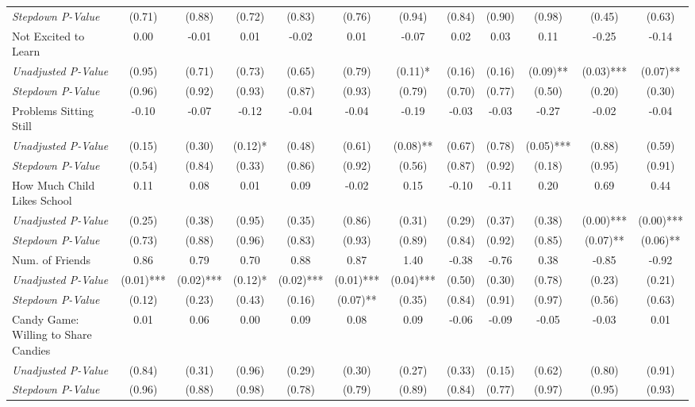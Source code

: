 \begin{tabular}{l c c c c c c c c c c c}
\quad \textit{Stepdown P-Value} & (0.71) & (0.88) & (0.72) & (0.83) & (0.76) & (0.94) & (0.84) & (0.90) & (0.98) & (0.45) & (0.63) \\
Not Excited to Learn & 0.00 & -0.01 & 0.01 & -0.02 & 0.01 & -0.07 & 0.02 & 0.03 & 0.11 & -0.25 & -0.14 \\
\quad \textit{Unadjusted P-Value} & (0.95) & (0.71) & (0.73) & (0.65) & (0.79) & (0.11)* & (0.16) & (0.16) & (0.09)** & (0.03)*** & (0.07)** \\
\quad \textit{Stepdown P-Value} & (0.96) & (0.92) & (0.93) & (0.87) & (0.93) & (0.79) & (0.70) & (0.77) & (0.50) & (0.20) & (0.30) \\
Problems Sitting Still & -0.10 & -0.07 & -0.12 & -0.04 & -0.04 & -0.19 & -0.03 & -0.03 & -0.27 & -0.02 & -0.04 \\
\quad \textit{Unadjusted P-Value} & (0.15) & (0.30) & (0.12)* & (0.48) & (0.61) & (0.08)** & (0.67) & (0.78) & (0.05)*** & (0.88) & (0.59) \\
\quad \textit{Stepdown P-Value} & (0.54) & (0.84) & (0.33) & (0.86) & (0.92) & (0.56) & (0.87) & (0.92) & (0.18) & (0.95) & (0.91) \\
How Much Child Likes School & 0.11 & 0.08 & 0.01 & 0.09 & -0.02 & 0.15 & -0.10 & -0.11 & 0.20 & 0.69 & 0.44 \\
\quad \textit{Unadjusted P-Value} & (0.25) & (0.38) & (0.95) & (0.35) & (0.86) & (0.31) & (0.29) & (0.37) & (0.38) & (0.00)*** & (0.00)*** \\
\quad \textit{Stepdown P-Value} & (0.73) & (0.88) & (0.96) & (0.83) & (0.93) & (0.89) & (0.84) & (0.92) & (0.85) & (0.07)** & (0.06)** \\
Num. of Friends & 0.86 & 0.79 & 0.70 & 0.88 & 0.87 & 1.40 & -0.38 & -0.76 & 0.38 & -0.85 & -0.92 \\
\quad \textit{Unadjusted P-Value} & (0.01)*** & (0.02)*** & (0.12)* & (0.02)*** & (0.01)*** & (0.04)*** & (0.50) & (0.30) & (0.78) & (0.23) & (0.21) \\
\quad \textit{Stepdown P-Value} & (0.12) & (0.23) & (0.43) & (0.16) & (0.07)** & (0.35) & (0.84) & (0.91) & (0.97) & (0.56) & (0.63) \\
Candy Game: Willing to Share Candies & 0.01 & 0.06 & 0.00 & 0.09 & 0.08 & 0.09 & -0.06 & -0.09 & -0.05 & -0.03 & 0.01 \\
\quad \textit{Unadjusted P-Value} & (0.84) & (0.31) & (0.96) & (0.29) & (0.30) & (0.27) & (0.33) & (0.15) & (0.62) & (0.80) & (0.91) \\
\quad \textit{Stepdown P-Value} & (0.96) & (0.88) & (0.98) & (0.78) & (0.79) & (0.89) & (0.84) & (0.77) & (0.97) & (0.95) & (0.93) \\
\bottomrule
\end{tabular}
